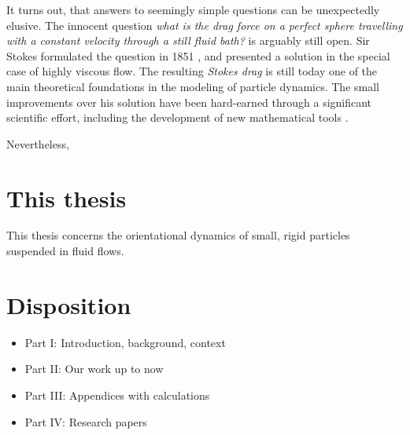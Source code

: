 \documentclass[thesis.tex]{subfiles}
\begin{document}
It turns out, that answers to seemingly simple questions can be unexpectedly elusive. The innocent question \emph{what is the drag force on a perfect sphere travelling with a constant velocity through a still fluid bath?} is arguably still open. Sir Stokes formulated the question in 1851 \cite{stokes1851}, and presented a solution in the special case of highly viscous flow. The resulting \emph{Stokes drag} is still today one of the main theoretical foundations in the modeling of particle dynamics. The small improvements over his solution have been hard-earned through a significant scientific effort, including the development of new mathematical tools \cite{goldenfeld2007}.

Nevertheless, 






\section*{This thesis}

This thesis concerns the orientational dynamics of small, rigid particles suspended in fluid flows. 

\section*{Disposition}

\begin{itemize}
	\item Part I: Introduction, background, context
	\item Part II: Our work up to now
	\item Part III: Appendices with calculations
	\item Part IV: Research papers
\end{itemize}
\end{document}
